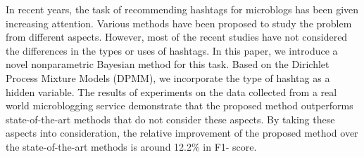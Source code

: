 In recent years, the task of recommending hashtags for microblogs has been given increasing attention. Various methods have been proposed to study the problem from different aspects. However, most of the recent studies have not considered the differences in the types or uses of hashtags. In this paper, we introduce a novel nonparametric Bayesian method for this task. Based on the Dirichlet Process Mixture Models (DPMM), we incorporate the type of hashtag as a hidden variable. The results of experiments on the data collected from a real world microblogging service demonstrate that the proposed method outperforms state-of-the-art methods that do not consider these aspects. By taking these aspects into consideration, the relative improvement of the proposed method over the state-of-the-art methods is around 12.2\% in F1- score.
